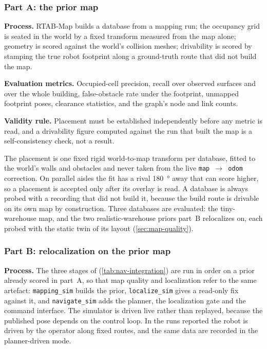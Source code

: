 \subsubsection{Part A: the prior map}
\label{sec:map-eval-method}

\textbf{Process.} RTAB-Map builds a database from a mapping run; the occupancy
grid is seated in the world by a fixed transform measured from the map alone;
geometry is scored against the world's collision meshes; drivability is scored
by stamping the true robot footprint along a ground-truth route that did not
build the map.

\textbf{Evaluation metrics.} Occupied-cell precision, recall over observed
surfaces and over the whole building, false-obstacle rate under the footprint,
unmapped footprint poses, clearance statistics, and the graph's node and link
counts.

\textbf{Validity rule.} Placement must be established independently before any
metric is read, and a drivability figure computed against the run that built
the map is a self-consistency check, not a result.

The placement is one fixed rigid world-to-map transform per database, fitted
to the world's walls and obstacles and never taken from the live
\texttt{map~$\rightarrow$~odom} correction. On parallel aisles the fit has a
rival \SI{180}{\degree} away that can score higher, so a placement is accepted
only after its overlay is read. A database is always probed with a recording
that did not build it, because the build route is drivable on its own map by
construction. Three databases are evaluated: the tiny-warehouse map, and the two
realistic-warehouse priors part~B relocalizes on, each probed with the static
twin of its layout (\cref{sec:map-quality}).

\subsubsection{Part B: relocalization on the prior map}
\label{sec:nav-eval-method}

\textbf{Process.} The three stages of 
(\cref{tab:nav-integration}) are run in order on a prior already scored in
part~A, so that map quality and localization refer to the same artefact:
\texttt{mapping\_sim} builds the prior, \texttt{localize\_sim} gives a
read-only fix against it, and \texttt{navigate\_sim} adds the planner, the
localization gate and the command interface. The simulator is driven live
rather than replayed, because the published pose depends on the control loop.
In the runs reported the robot is driven by the operator along fixed routes,
and the same data are recorded in the planner-driven mode.

